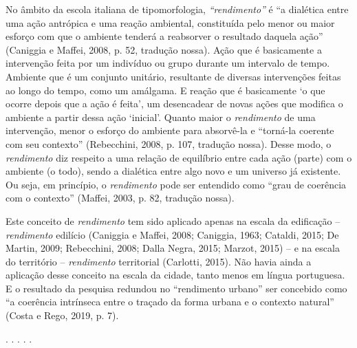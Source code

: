 \documentclass[12pt, a4paper]{book} %
\begin{document}
        No âmbito da escola italiana de tipomorfologia, \textit{``rendimento''} é ``a dialética entre uma ação antrópica e uma reação ambiental, constituída pelo menor ou maior esforço com que o ambiente tenderá a reabsorver o resultado daquela ação'' (Caniggia e Maffei, 2008, p. 52, tradução nossa). Ação que é basicamente a intervenção feita por um indivíduo ou grupo durante um intervalo de tempo. Ambiente que é um conjunto unitário, resultante de diversas intervenções feitas ao longo do tempo, como um amálgama. E reação que é basicamente `o que ocorre depois que a ação é feita', um desencadear de novas ações que modifica o ambiente a partir dessa ação `inicial'. Quanto maior o \textit{rendimento} de uma intervenção, menor o esforço do ambiente para absorvê-la e ``torná-la coerente com seu contexto'' (Rebecchini, 2008, p. 107, tradução nossa). Desse modo, o \textit{rendimento} diz respeito a uma relação de equilíbrio entre cada ação (parte) com o ambiente (o todo), sendo a dialética entre algo novo e um universo já existente. Ou seja, em princípio, o \textit{rendimento} pode ser entendido como ``grau de coerência com o contexto'' (Maffei, 2003, p. 82, tradução nossa).

        Este conceito de \textit{rendimento} tem sido aplicado apenas na escala da edificação – \textit{rendimento} edilício (Caniggia e Maffei, 2008; Caniggia, 1963; Cataldi, 2015; De Martin, 2009; Rebecchini, 2008; Dalla Negra, 2015; Marzot, 2015) – e na escala do território – \textit{rendimento} territorial (Carlotti, 2015). Não havia ainda a aplicação desse conceito na escala da cidade, tanto menos em língua portuguesa. E o resultado da pesquisa redundou no ``rendimento urbano'' ser concebido como ``a coerência intrínseca entre o traçado da forma urbana e o contexto natural'' (Costa e Rego, 2019, p. 7).

        
   

        \begin{center}
        . . . . .
        \end{center} 

\end{document}
